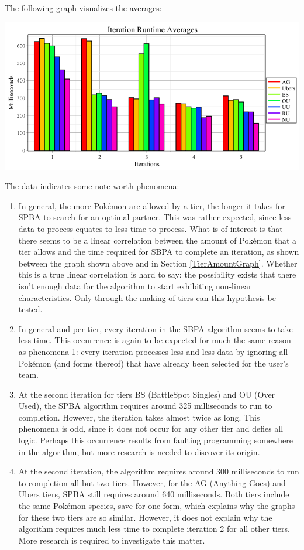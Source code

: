 \documentclass{article}
\begin{document}
The following graph visualizes the averages:
\begin{center}
	\includegraphics[width=\textwidth]{RuntimeAverages.png}
\end{center}
The data indicates some note-worth phenomena:
\begin{enumerate}
	\item In general, the more Pok\'emon are allowed by a tier, the longer it takes for SPBA to search for an optimal partner. This was rather expected, since less data to process equates to less time to process. What is of interest is that there seems to be a linear correlation between the amount of Pok\'emon that a tier allows and the time required for SBPA to complete an iteration, as shown between the graph shown above and in Section \ref{TierAmountGraph}. Whether this is a true linear correlation is hard to say: the possibility exists that there isn't enough data for the algorithm to start exhibiting non-linear characteristics. Only through the making of tiers can this hypothesis be tested.
	\item In general and per tier, every iteration in the SBPA algorithm seems to take less time. This occurrence is again to be expected for much the same reason as phenomena 1: every iteration processes less and less data by ignoring all Pok\'emon (and forms thereof) that have already been selected for the user's team.
	\item At the second iteration for tiers BS (BattleSpot Singles) and OU (Over Used), the SPBA algorithm requires around 325 milliseconds to run to completion. However, the iteration takes almost twice as long. This phenomena is odd, since it does not occur for any other tier and defies all logic. Perhaps this occurrence results from faulting programming somewhere in the algorithm, but more research is needed to discover its origin.
	\item At the second iteration, the algorithm requires around 300 milliseconds to run to completion all but two tiers. However, for the AG (Anything Goes) and Ubers tiers, SPBA still requires around 640 milliseconds. Both tiers include the same Pok\'emon species, save for one form, which explains why the graphs for these two tiers are so similar. However, it does not explain why the algorithm requires much less time to complete iteration 2 for all other tiers. More research is required to investigate this matter.
\end{enumerate}
\end{document}
